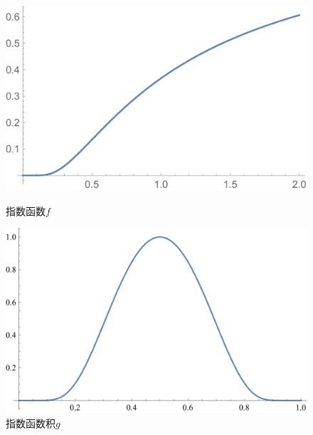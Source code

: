 \begin{figure}[htb]
    \begin{minipage}[t]{0.5\linewidth}
        \centering
        \includegraphics[scale=0.3]{fig/ch4-exp1.pdf}
        \caption{指数函数$f$}\label{chdm:pic_exp1}
    \end{minipage}%
    \begin{minipage}[t]{0.5\linewidth}
        \centering
        \includegraphics[scale=0.3]{fig/ch4-exp2.pdf}
        \caption{指数函数积$g$}\label{chdm:pic_exp2}
    \end{minipage}
\end{figure}

